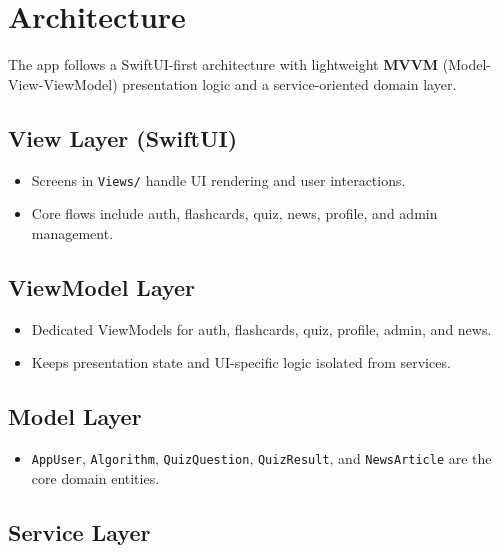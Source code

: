 \documentclass[12pt,a4paper]{article}
\begin{document}
\section*{Architecture}

The app follows a SwiftUI-first architecture with lightweight \textbf{MVVM}
(Model-View-ViewModel) presentation logic and a service-oriented domain layer.

\subsection*{View Layer (SwiftUI)}

\begin{itemize}[leftmargin=1.5em, itemsep=3pt]
  \item Screens in \texttt{Views/} handle UI rendering and user interactions.
  \item Core flows include auth, flashcards, quiz, news, profile, and admin management.
\end{itemize}

\subsection*{ViewModel Layer}

\begin{itemize}[leftmargin=1.5em, itemsep=3pt]
  \item Dedicated ViewModels for auth, flashcards, quiz, profile, admin, and news.
  \item Keeps presentation state and UI-specific logic isolated from services.
\end{itemize}

\subsection*{Model Layer}

\begin{itemize}[leftmargin=1.5em, itemsep=3pt]
  \item \texttt{AppUser}, \texttt{Algorithm}, \texttt{QuizQuestion}, \texttt{QuizResult},
        and \texttt{NewsArticle} are the core domain entities.
\end{itemize}

\subsection*{Service Layer}
\end{document}
